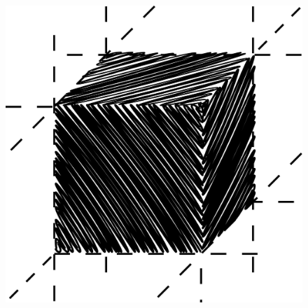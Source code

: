 \documentclass[a4paper, 11pt]{article}
\begin{document}
	\begin{minipage}[t]{0.33\textwidth}
		\begin{figure}[H]
			\setlength{\fboxsep}{0pt}
			\hspace*{0.1\textwidth}
			\includegraphics[width=\textwidth]{sources/cube.png}
		\end{figure}
	\end{minipage}
\end{document}
